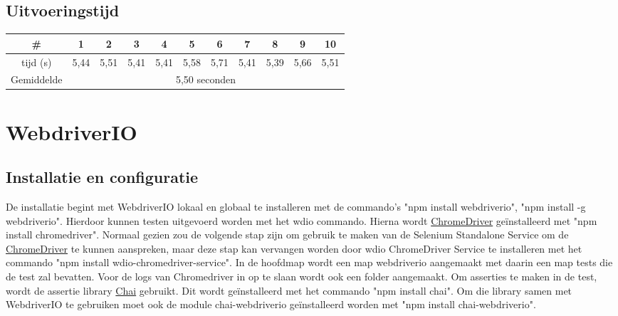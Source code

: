 \subsection{Uitvoeringstijd}


\begin{tabular}{ |c| |c |c |c |c |c |c |c |c |c |c| }
\hline
	\# & 1 & 2 & 3 & 4 & 5 & 6 & 7 & 8 & 9 & 10\\
\hline
	tijd (s) & 5,44 & 5,51 & 5,41 & 5,41 & 5,58 & 5,71 & 5,41 & 5,39 & 5,66 & 5,51\\
\hline
 Gemiddelde & \multicolumn{10}{c|}{5,50 seconden}\\
\hline
\end{tabular}


\clearpage
\section{WebdriverIO}
\subsection{Installatie en configuratie}
De installatie begint met WebdriverIO lokaal en globaal te installeren met de commando's "npm install webdriverio", "npm install -g webdriverio". Hierdoor kunnen testen uitgevoerd worden met het wdio commando. Hierna wordt \hyperref[chromedriver]{ChromeDriver} geïnstalleerd met "npm install chromedriver". Normaal gezien zou de volgende stap zijn om gebruik te maken van de Selenium Standalone Service om de \hyperref[chromedriver]{ChromeDriver} te kunnen aanspreken, maar deze stap kan vervangen worden door wdio ChromeDriver Service te installeren met het commando "npm install wdio-chromedriver-service". In de hoofdmap wordt een map webdriverio aangemaakt met daarin een map tests die de test zal bevatten. Voor de logs van Chromedriver in op te slaan wordt ook een folder aangemaakt. Om \glspl{assertie} te maken in de test, wordt de \gls{assertie} \gls{library} \hyperref[chai]{Chai} gebruikt. Dit wordt geïnstalleerd met het commando "npm install chai". Om die \gls{library} samen met WebdriverIO te gebruiken moet ook de module chai-webdriverio geïnstalleerd worden met "npm install chai-webdriverio".

